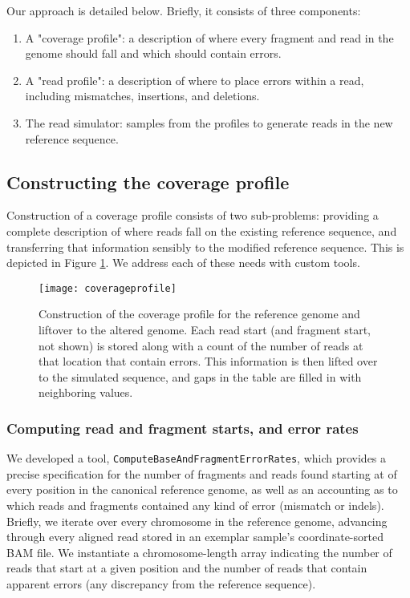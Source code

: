 Our approach is detailed below.  Briefly, it consists of three components:

\begin{enumerate}
    \item A "coverage profile": a description of where every fragment and read in the genome should fall and which should contain errors.
    \item A "read profile": a description of where to place errors within a read, including mismatches, insertions, and deletions.
    \item The read simulator: samples from the profiles to generate reads in the new reference sequence.
\end{enumerate}

\subsection{Constructing the coverage profile}

Construction of a coverage profile consists of two sub-problems: providing a complete description of where reads fall on the existing reference sequence, and transferring that information sensibly to the modified reference sequence.  This is depicted in Figure \ref{fig:coverageprofile}.  We address each of these needs with custom tools.

\begin{figure}[h!]
  \centering
    \texttt{[image: coverageprofile]}
  \caption{Construction of the coverage profile for the reference genome and liftover to the altered genome.  Each read start (and fragment start, not shown) is stored along with a count of the number of reads at that location that contain errors.  This information is then lifted over to the simulated sequence, and gaps in the table are filled in with neighboring values.}
  \label{fig:coverageprofile}
\end{figure}

\subsubsection{Computing read and fragment starts, and error rates}

We developed a tool, \texttt{ComputeBaseAndFragmentErrorRates}, which provides a precise specification for the number of fragments and reads found starting at of every position in the canonical reference genome, as well as an accounting as to which reads and fragments contained any kind of error (mismatch or indels).  Briefly, we iterate over every chromosome in the reference genome, advancing through every aligned read stored in an exemplar sample's coordinate-sorted BAM file.  We instantiate a chromosome-length array indicating the number of reads that start at a given position and the number of reads that contain apparent errors (any discrepancy from the reference sequence).

